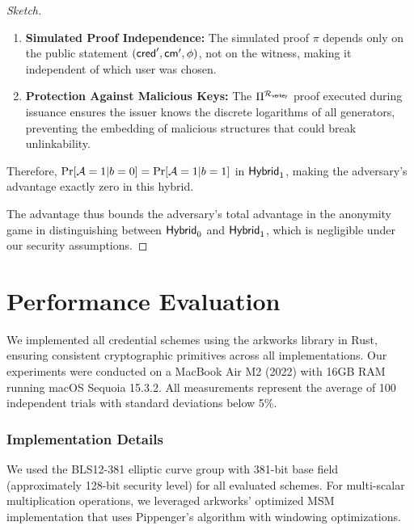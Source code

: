 \begin{proof}[Sketch]
\begin{enumerate}
    \item \textbf{Simulated Proof Independence:} The simulated proof $\pi$ depends only on the public statement $(\mathsf{cred}', \mathsf{cm}', \phi)$, not on the witness, making it independent of which user was chosen.
    
    \item \textbf{Protection Against Malicious Keys:} The $\Pi^{\mathcal{R}_{\mathsf{verkey}}}$ proof executed during issuance ensures the issuer knows the discrete logarithms of all generators, preventing the embedding of malicious structures that could break unlinkability.
\end{enumerate}

Therefore, $\Pr[\mathcal{A} = 1 | b = 0] = \Pr[\mathcal{A} = 1 | b = 1]$ in $\mathsf{Hybrid}_1$, making the adversary's advantage exactly zero in this hybrid.

The advantage thus bounds the adversary's total advantage in the anonymity game in distinguishing between $\mathsf{Hybrid}_0$ and $\mathsf{Hybrid}_1$, which is negligible under our security assumptions.
\end{proof}



\section{Performance Evaluation}


We implemented all credential schemes using the arkworks library \cite{arkworks_contributors_arkworks_2022} in Rust, ensuring consistent cryptographic primitives across all implementations. Our experiments were conducted on a MacBook Air M2 (2022) with 16GB RAM running macOS Sequoia 15.3.2. All measurements represent the average of 100 independent trials with standard deviations below 5\%.

\subsubsection{Implementation Details}
We used the BLS12-381 elliptic curve group with 381-bit base field (approximately 128-bit security level) for all evaluated schemes. For multi-scalar multiplication operations, we leveraged arkworks' optimized MSM implementation that uses Pippenger's algorithm with windowing optimizations.

